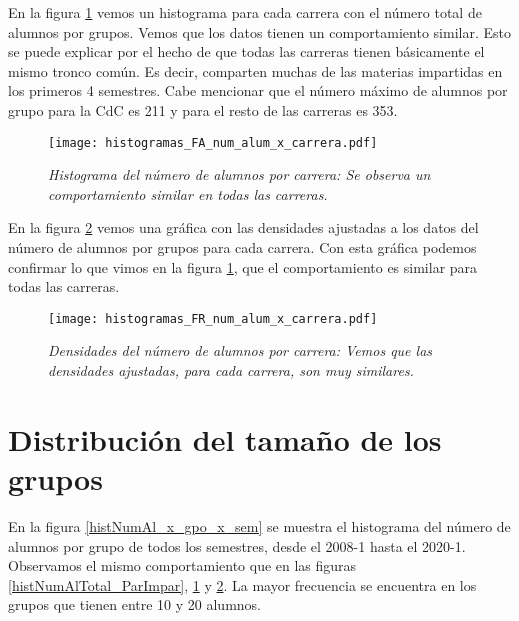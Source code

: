 En la figura \ref{histFAnumAl_x_carrera} vemos un histograma para cada carrera con el número total de alumnos por grupos. Vemos que los datos tienen un comportamiento similar. Esto se puede explicar por el hecho de que todas las carreras tienen básicamente el mismo tronco común. Es decir, comparten muchas de las materias impartidas en los primeros 4 semestres. Cabe mencionar que el número máximo de alumnos por grupo para la CdC es 211 y para el resto de las carreras es 353.

\begin{figure}[H]
\centering
\texttt{[image: histogramas\_FA\_num\_alum\_x\_carrera.pdf]} %
\caption[\textit{Histograma del número de alumnos por carrera}]{\textit{Histograma del número de alumnos por carrera: Se observa un comportamiento similar en todas las carreras.}}\label{histFAnumAl_x_carrera}
\end{figure}


En la figura \ref{histFRnumAl_x_carrera} vemos una gráfica con las densidades ajustadas a los datos del número de alumnos por grupos para cada carrera. Con esta gráfica podemos confirmar lo que vimos en la figura \ref{histFAnumAl_x_carrera}, que el comportamiento es similar para todas las carreras.

\begin{figure}[H]
\centering
\texttt{[image: histogramas\_FR\_num\_alum\_x\_carrera.pdf]} %
\caption[\textit{Densidades del número de alumnos por carrera}]{\textit{Densidades del número de alumnos por carrera: Vemos que las densidades ajustadas, para cada carrera, son muy similares.}}\label{histFRnumAl_x_carrera}
\end{figure}


\section{Distribución del tamaño de los grupos} \label{DitribTamGpos}

En la figura \ref{histNumAl_x_gpo_x_sem} se muestra el histograma del número de alumnos por grupo de todos los semestres, desde el 2008-1 hasta el 2020-1. Observamos el mismo comportamiento que en las figuras \ref{histNumAlTotal_ParImpar}, \ref{histFAnumAl_x_carrera} y \ref{histFRnumAl_x_carrera}. La mayor frecuencia se encuentra en los grupos que tienen entre 10 y 20 alumnos.


